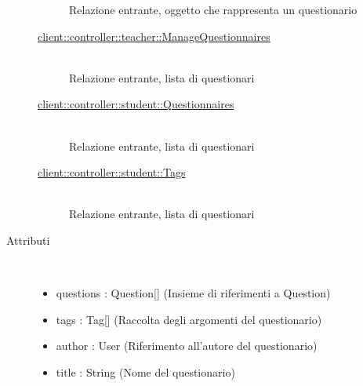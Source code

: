 \begin{description}
\begin{description}
 Relazione entrante, oggetto che rappresenta un questionario
\item[\hyperlink{client::controller::teacher::ManageQuestionnaires}{client::controller::teacher::ManageQuestionnaires}] \hfill \\
 Relazione entrante, lista di questionari
\item[\hyperlink{client::controller::student::Questionnaires}{client::controller::student::Questionnaires}] \hfill \\
 Relazione entrante, lista di questionari
\item[\hyperlink{client::controller::student::Tags}{client::controller::student::Tags}] \hfill \\
 Relazione entrante, lista di questionari
\end{description}

\item[Attributi] \hfill \\
 \vspace{-7mm}
\begin{itemize}
\item questions : Question[] (Insieme di riferimenti a Question)
\item tags : Tag[] (Raccolta degli argomenti del questionario)
\item author : User (Riferimento all'autore del questionario)
\item title : String (Nome del questionario)
\end{itemize}

\end{description}

